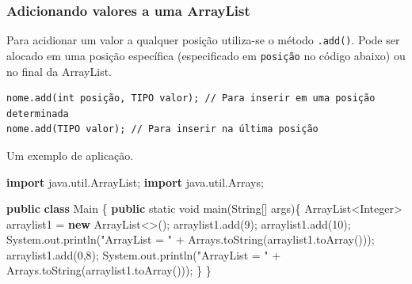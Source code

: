\documentclass[
]{book}
\newenvironment{Shaded}{\begin{snugshade}}{\end{snugshade}}
\newcommand{\BuiltInTok}[1]{#1}
\newcommand{\DataTypeTok}[1]{\textcolor[rgb]{0.13,0.29,0.53}{#1}}
\newcommand{\DecValTok}[1]{\textcolor[rgb]{0.00,0.00,0.81}{#1}}
\newcommand{\FunctionTok}[1]{\textcolor[rgb]{0.00,0.00,0.00}{#1}}
\newcommand{\ImportTok}[1]{#1}
\newcommand{\KeywordTok}[1]{\textcolor[rgb]{0.13,0.29,0.53}{\textbf{#1}}}
\newcommand{\NormalTok}[1]{#1}
\newcommand{\StringTok}[1]{\textcolor[rgb]{0.31,0.60,0.02}{#1}}
\begin{document}
\hypertarget{adicionando-valores-a-uma-arraylist}{%
\subsubsection*{Adicionando valores a uma ArrayList}\label{adicionando-valores-a-uma-arraylist}}

Para acidionar um valor a qualquer posição utiliza-se o método \texttt{.add()}. Pode ser alocado em uma posição específica (especificado em \texttt{posição} no código abaixo) ou no final da ArrayList.

\begin{verbatim}
nome.add(int posição, TIPO valor); // Para inserir em uma posição determinada
nome.add(TIPO valor); // Para inserir na última posição
\end{verbatim}

Um exemplo de aplicação.

\begin{Shaded}
\begin{Highlighting}[]
\KeywordTok{import}\ImportTok{ java.util.ArrayList;}
\KeywordTok{import}\ImportTok{ java.util.Arrays;}

\KeywordTok{public} \KeywordTok{class}\NormalTok{ Main \{}
    \KeywordTok{public} \DataTypeTok{static} \DataTypeTok{void} \FunctionTok{main}\NormalTok{(}\BuiltInTok{String}\NormalTok{[] args)\{}
        \BuiltInTok{ArrayList}\NormalTok{<}\BuiltInTok{Integer}\NormalTok{> arraylist1 = }\KeywordTok{new} \BuiltInTok{ArrayList}\NormalTok{<>();}
\NormalTok{        arraylist1.}\FunctionTok{add}\NormalTok{(}\DecValTok{9}\NormalTok{);}
\NormalTok{        arraylist1.}\FunctionTok{add}\NormalTok{(}\DecValTok{10}\NormalTok{);}
        \BuiltInTok{System}\NormalTok{.}\FunctionTok{out}\NormalTok{.}\FunctionTok{println}\NormalTok{(}\StringTok{"ArrayList = "}\NormalTok{ + }\BuiltInTok{Arrays}\NormalTok{.}\FunctionTok{toString}\NormalTok{(arraylist1.}\FunctionTok{toArray}\NormalTok{()));}
\NormalTok{        arraylist1.}\FunctionTok{add}\NormalTok{(}\DecValTok{0}\NormalTok{,}\DecValTok{8}\NormalTok{);}
        \BuiltInTok{System}\NormalTok{.}\FunctionTok{out}\NormalTok{.}\FunctionTok{println}\NormalTok{(}\StringTok{"ArrayList = "}\NormalTok{ + }\BuiltInTok{Arrays}\NormalTok{.}\FunctionTok{toString}\NormalTok{(arraylist1.}\FunctionTok{toArray}\NormalTok{()));}
\NormalTok{    \}}
\NormalTok{\}}
\end{Highlighting}
\end{Shaded}
\end{document}
